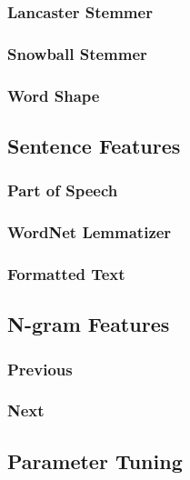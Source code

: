 \documentclass[preprint]{style}
\begin{document}
\subsubsection{Lancaster Stemmer}

\subsubsection{Snowball Stemmer}

\subsubsection{Word Shape}

\subsection{Sentence Features}

\subsubsection{Part of Speech}

\subsubsection{WordNet Lemmatizer}

\subsubsection{Formatted Text}

\subsection{N-gram Features}

\subsubsection{Previous}

\subsubsection{Next}

\subsection{Parameter Tuning}
\end{document}
